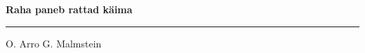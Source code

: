 \documentclass[10pt]{book}
\begin{document}
{
  \samepage
  \raggedbottom
  \raggedright
  \sloppy


  \vspace{0.2in}

  \noindent\begin{minipage}{.1\textwidth}
    \hfill\vspace{0.1in}
  \end{minipage}%
  \noindent\begin{minipage}{.8\textwidth}
    \centering
    \bfseries
    \large Raha paneb rattad k\"aima
  \end{minipage}%
  \noindent\begin{minipage}{.1\textwidth}
      \hfill\vspace{0.1in}
  \end{minipage}

  \nopagebreak[4]
  \vspace{0.1in}
  \nopagebreak[4]
  \hrule height 0.05ex
  \nopagebreak[4]
  \vspace{-0.05in}

  {\footnotesize O. Arro \hfill G. Malmstein }\\
  \vspace{0.01in}



}
\end{document}

